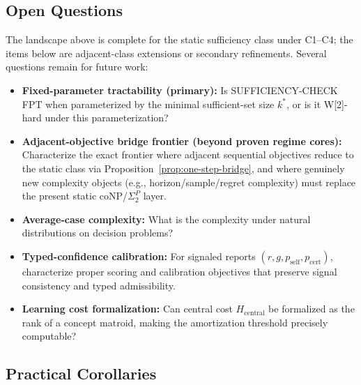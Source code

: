 \subsection*{Open Questions}

The landscape above is complete for the static sufficiency class under C1--C4; the items below are adjacent-class extensions or secondary refinements.
Several questions remain for future work:
\begin{itemize}
\item \textbf{Fixed-parameter tractability (primary):} Is SUFFICIENCY-CHECK FPT when parameterized by the minimal sufficient-set size $k^*$, or is it W[2]-hard under this parameterization?
\item \textbf{Adjacent-objective bridge frontier (beyond proven regime cores):} Characterize the exact frontier where adjacent sequential objectives reduce to the static class via Proposition~\ref{prop:one-step-bridge}, and where genuinely new complexity objects (e.g., horizon/sample/regret complexity) must replace the present static coNP/\(\Sigma_2^P\) layer.
\item \textbf{Average-case complexity:} What is the complexity under natural distributions on decision problems?
\item \textbf{Typed-confidence calibration:} For signaled reports $(r,g,p_{\mathrm{self}},p_{\mathrm{cert}})$, characterize proper scoring and calibration objectives that preserve signal consistency and typed admissibility.
\item \textbf{Learning cost formalization:} Can central cost $H_{\text{central}}$ be formalized as the rank of a concept matroid, making the amortization threshold precisely computable?
\end{itemize}

\subsection*{Practical Corollaries}

